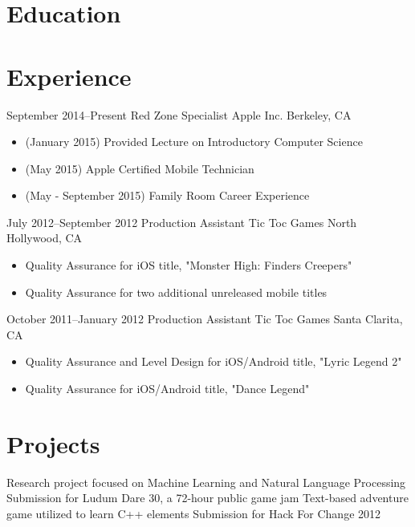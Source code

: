 \documentclass[11pt,a4paper,sans]{moderncv}        %
\begin{document}
\makecvtitle

\section{Education}

\section{Experience}		%
\cventry
{September 2014--Present}	{Red Zone Specialist}
{Apple Inc.}	{Berkeley, CA}
{}
{
  \begin{itemize}
  \item (January 2015) Provided Lecture on Introductory Computer Science 
  \item (May 2015) Apple Certified Mobile Technician
  \item (May - September 2015) Family Room Career Experience
\end{itemize}
}	%

\cventry
{July 2012--September 2012}	{Production Assistant}
{Tic Toc Games}	{North Hollywood, CA}
{}
{
  \begin{itemize}
  \item Quality Assurance for iOS title, "Monster High: Finders Creepers"
  \item Quality Assurance for two additional unreleased mobile titles
  \end{itemize}
}	%

\cventry
{October 2011--January 2012}	{Production Assistant}
{Tic Toc Games}	{Santa Clarita, CA}
{}
{
  \begin{itemize}
  \item Quality Assurance and Level Design for iOS/Android title, "Lyric Legend 2"
  \item Quality Assurance for iOS/Android title, "Dance Legend"
  \end{itemize}
}	%

\section{Projects}		%
			{Research project focused on Machine Learning and Natural Language Processing}
			{Submission for Ludum Dare 30, a 72-hour public game jam}
			{Text-based adventure game utilized to learn C++ elements}
	{Submission for Hack For Change 2012}
\end{document}
